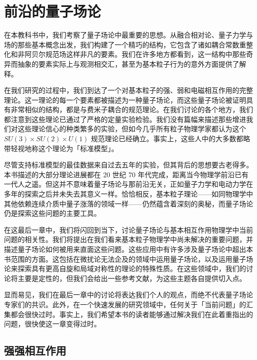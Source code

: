 \chapter{前沿的量子场论}

在本教科书中，我们考察了量子场论中最重要的思想。从融合相对论、量子力学与场的那些基本概念出发，我们构建了一个精巧的结构，它包含了诸如耦合常数重整化和非阿贝尔规范场这样非凡的要素。我们在许多地方都看到，这一结构中那些奇异而抽象的要素实际上与观测相交汇，甚至为基本粒子行为的意外方面提供了解释。

在我们研究的过程中，我们到达了一个对基本粒子的强、弱和电磁相互作用的完整理论。这一理论的每一个要素都被描述为一种量子场论，而这些量子场论被证明具有非常相似的结构，都是与费米子耦合的规范理论。在我们讨论的各个地方，我们都注意到这些理论已通过了严格的定量实验检验。我们没有篇幅来描述那些增进我们对这些理论信心的种类繁多的实验，但如今几乎所有粒子物理学家都认为这个 $SU(3)\times SU(2)\times U(1)$ 规范理论已经确立。事实上，这些人中的大多数都略带轻视地称这个理论为「标准模型」。

尽管支持标准模型的最佳数据来自过去五年的实验，但其背后的思想要古老得多。本书描述的大部分理论进展都在 20 世纪 70 年代完成，距离当今物理学前沿已有一代人之遥。但这并不意味着量子场论与那前沿无关，正如量子力学和电动力学在多年的探索之后并未失去其意义一样。恰恰相反，基本粒子理论——如同物理学中其他依赖连续介质中量子涨落的领域一样——仍然蕴含着深刻的奥秘，而量子场论仍是探索这些问题的主要工具。

在这最后一章中，我们将闪回到当下，讨论量子场论与基本相互作用物理学中当前问题的相关性。我们将提出在我们看来基本粒子物理学中尚未解决的重要问题，并描述量子场论如何被用来直面这些问题。这些应用中有许多涉及量子场论中超出本书范围的方面。这包括在微扰论无法企及的领域中运用量子场论，以及运用量子场论来探索具有更高自旋和局域对称性的理论的特殊性质。在这些领域中，我们的讨论将主要是定性的，但我们会给出一些参考文献，为这些主题各自提供切入点。

显而易见，我们在最后一章中的讨论将表达我们个人的观点，而绝不代表量子场论专家们的共识。此外，在一个快速发展的研究领域中，任何关于「当前问题」的汇集都会很快过时。事实上，我们希望本书的读者能够通过解决我们在此着重指出的问题，很快使这一章变得过时。

\section{强强相互作用}

